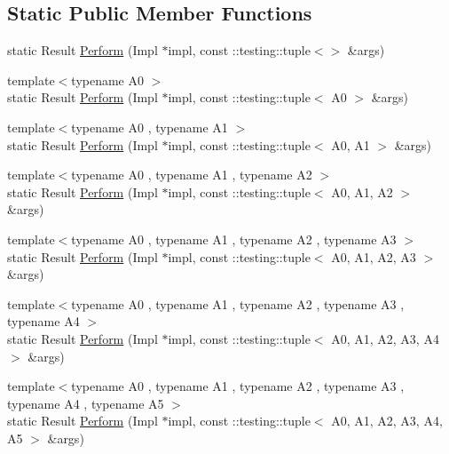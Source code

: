 \subsection*{Static Public Member Functions}
\begin{DoxyCompactItemize}
\item 
static Result \hyperlink{classtesting_1_1internal_1_1ActionHelper_a25176836b0a381d883d61c3a2dc60662}{Perform} (Impl $\ast$impl, const \+::testing\+::tuple$<$$>$ \&args)
\item 
{\footnotesize template$<$typename A0 $>$ }\\static Result \hyperlink{classtesting_1_1internal_1_1ActionHelper_a08d2e199b0a3a1f9e05982cae07db3ec}{Perform} (Impl $\ast$impl, const \+::testing\+::tuple$<$ A0 $>$ \&args)
\item 
{\footnotesize template$<$typename A0 , typename A1 $>$ }\\static Result \hyperlink{classtesting_1_1internal_1_1ActionHelper_a96d8d8399ff3322e77ba1de51c166f4e}{Perform} (Impl $\ast$impl, const \+::testing\+::tuple$<$ A0, A1 $>$ \&args)
\item 
{\footnotesize template$<$typename A0 , typename A1 , typename A2 $>$ }\\static Result \hyperlink{classtesting_1_1internal_1_1ActionHelper_ad450478d185cbcac0e1383f7517f5c36}{Perform} (Impl $\ast$impl, const \+::testing\+::tuple$<$ A0, A1, A2 $>$ \&args)
\item 
{\footnotesize template$<$typename A0 , typename A1 , typename A2 , typename A3 $>$ }\\static Result \hyperlink{classtesting_1_1internal_1_1ActionHelper_a2ceda08aeb7b9fd1ad6ccb0821a3ea39}{Perform} (Impl $\ast$impl, const \+::testing\+::tuple$<$ A0, A1, A2, A3 $>$ \&args)
\item 
{\footnotesize template$<$typename A0 , typename A1 , typename A2 , typename A3 , typename A4 $>$ }\\static Result \hyperlink{classtesting_1_1internal_1_1ActionHelper_afd2d1dcea480db63416fc3b8604dec56}{Perform} (Impl $\ast$impl, const \+::testing\+::tuple$<$ A0, A1, A2, A3, A4 $>$ \&args)
\item 
{\footnotesize template$<$typename A0 , typename A1 , typename A2 , typename A3 , typename A4 , typename A5 $>$ }\\static Result \hyperlink{classtesting_1_1internal_1_1ActionHelper_a58e3b1699dd3a4404ed2cd652327d8ca}{Perform} (Impl $\ast$impl, const \+::testing\+::tuple$<$ A0, A1, A2, A3, A4, A5 $>$ \&args)
\item 
$$
\end{DoxyCompactItemize}
